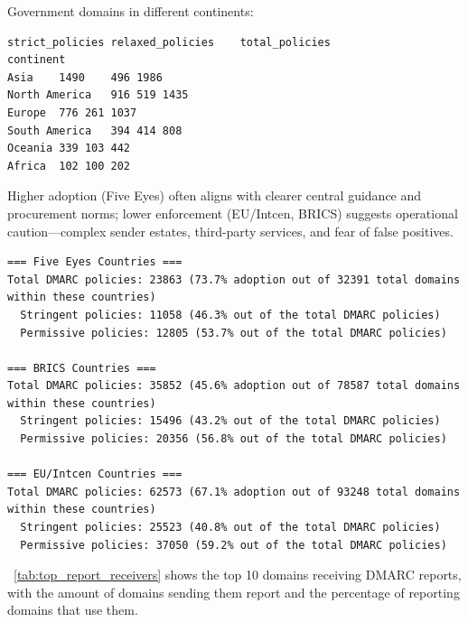Government domains in different continents:
\begin{verbatim}
strict_policies	relaxed_policies	total_policies
continent			
Asia	1490	496	1986
North America	916	519	1435
Europe	776	261	1037
South America	394	414	808
Oceania	339	103	442
Africa	102	100	202
\end{verbatim}

Higher adoption (Five Eyes) often aligns with clearer central guidance and procurement norms; lower enforcement (EU/Intcen, BRICS) suggests operational caution—complex sender estates, third-party services, and fear of false positives.
\begin{verbatim}
=== Five Eyes Countries ===
Total DMARC policies: 23863 (73.7% adoption out of 32391 total domains within these countries)
  Stringent policies: 11058 (46.3% out of the total DMARC policies)
  Permissive policies: 12805 (53.7% out of the total DMARC policies)

=== BRICS Countries ===
Total DMARC policies: 35852 (45.6% adoption out of 78587 total domains within these countries)
  Stringent policies: 15496 (43.2% out of the total DMARC policies)
  Permissive policies: 20356 (56.8% out of the total DMARC policies)

=== EU/Intcen Countries ===
Total DMARC policies: 62573 (67.1% adoption out of 93248 total domains within these countries)
  Stringent policies: 25523 (40.8% out of the total DMARC policies)
  Permissive policies: 37050 (59.2% out of the total DMARC policies)
\end{verbatim}


~\cref{tab:top_report_receivers} shows the top 10 domains receiving \gls{DMARC} reports, with the amount of domains sending them report and the percentage of reporting domains that use them.
